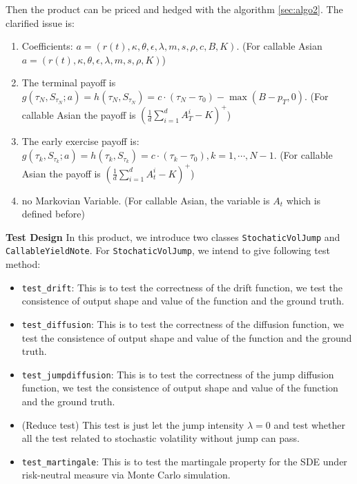 \documentclass[11pt,a4paper]{article}
\theoremstyle{remark}
\begin{document}
Then the product can be priced and hedged with the algorithm \ref{sec:algo2}.
The clarified issue is:
\begin{enumerate}
	\item Coefficients: $a = (r(t), \kappa, \theta, \epsilon, \lambda, m, s, \rho, c, B,  K)$. (For callable Asian $a = (r(t), \kappa, \theta, \epsilon, \lambda, m, s, \rho,  K)$)
	\item The terminal payoff is 	$g(\tau_N, S_{\tau_N}; a) = h(\tau_N, S_{\tau_N}) = c \cdot (\tau_N - \tau_0) - \max(B - p_T, 0)$. (For callable Asian the payoff is $\left(\frac{1}{d}\sum_{i=1}^dA^i_T - K \right)^{+}$)
	\item The early exercise payoff is: $g(\tau_k, S_{\tau_k}; a) = h(\tau_k, S_{\tau_k}) = c \cdot (\tau_k - \tau_0), k=1,\cdots,N-1 $. (For callable Asian the payoff is $\left(\frac{1}{d}\sum_{i=1}^dA^i_t - K \right)^{+}$)
	\item no Markovian Variable. (For callable Asian, the variable is $A_t$ which is defined before)
\end{enumerate}

\noindent \textbf{Test Design}
In this product, we introduce two classes \texttt{StochaticVolJump} and \texttt{CallableYieldNote}. For \texttt{StochaticVolJump}, we intend to give following test method:
\begin{itemize}
	\item  \texttt{test\_drift}: This is to test the correctness of the drift function, we test the consistence of output shape and value of the function and the ground truth.
	\item  \texttt{test\_diffusion}: This is to test the correctness of the diffusion function, we test the consistence of output shape and value of the function and the ground truth.
	
	\item  \texttt{test\_jumpdiffusion}: This is to test the correctness of the jump diffusion function, we test the consistence of output shape and value of the function and the ground truth.
	
	\item (Reduce test) This test is just let the jump intensity $\lambda = 0$ and test whether all the test related to stochastic volatility without jump can pass.
	
	\item  \texttt{test\_martingale}: This is to test the martingale property for the SDE under risk-neutral measure via Monte Carlo simulation.
\end{itemize}
\end{document}
